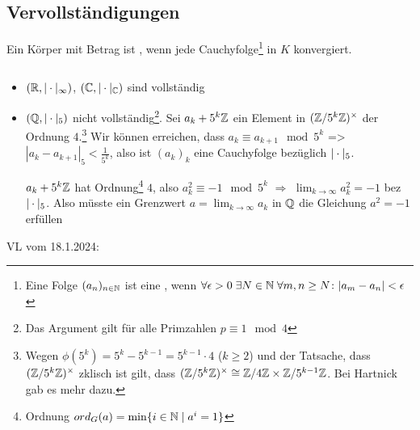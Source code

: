 \documentclass[../main.tex]{subfiles}
\begin{document}
\subsection{Vervollständigungen}
\begin{definition}
    Ein Körper mit Betrag ist , wenn jede Cauchyfolge\footnote{Eine Folge $(a_n)_{n\in\mathbb{N}}$ ist eine , wenn $\forall\epsilon>0\;\exists N\in \mathbb{N}\;\forall m,n\geq N\colon |a_m - a_n| <\epsilon$} in $K$ konvergiert.
\end{definition}
\begin{example} \label{theo:4.18}$ $
    \begin{itemize}
        \item $(\mathbb{R},|\cdot|_\infty)$, $(\mathbb{C}, |\cdot|_{\mathbb{C}})$ sind vollständig
        \item $(\mathbb{Q}, |\cdot|_5)$ nicht vollständig\footnote{Das Argument gilt für alle Primzahlen $p\equiv 1\mod 4$}.
        Sei $a_k + 5^k\mathbb{Z}$ ein Element in $(\mathbb{Z}/5^k\mathbb{Z})^\times$ der Ordnung $4$.\footnote{Wegen $\phi(5^k) = 5^k-5^{k-1}  = 5^{k-1} \cdot 4$ ($k\geq 2$) und der Tatsache, dass $(\mathbb{Z}/5^k\mathbb{Z})^\times$ zklisch ist gilt, dass $(\mathbb{Z}/5^k\mathbb{Z})^\times \cong \mathbb{Z}/4\mathbb{Z} \times \mathbb{Z}/5^{k-1}\mathbb{Z}$. Bei Hartnick gab es mehr dazu.}
        Wir können erreichen, dass $a_k\equiv a_{k+1}\mod 5^k$
        => $|a_k-a_{k+1}|_5 < \frac{1}{5^k}$, also ist $(a_k)_k$ eine Cauchyfolge bezüglich $|\cdot|_5$.

        $a_k + 5^k\mathbb{Z}$ hat Ordnung\footnote{Ordnung $ord_G(a) = \min\{i\in\mathbb{N}\mid a^i = 1\}$} $4$, also $a_k^2 \equiv -1 \mod 5^k$ $\Longrightarrow$ $\lim_{k\rightarrow \infty} a_k^2 = -1$ bez $|\cdot|_5$.
        Also müsste ein Grenzwert $a=\lim_{k\rightarrow \infty} a_k$ in $\mathbb{Q}$ die Gleichung $a^2= -1$ erfüllen \Lightning
    \end{itemize}
\end{example}

\begin{flushright}
VL vom 18.1.2024:
\end{flushright}
\end{document}
